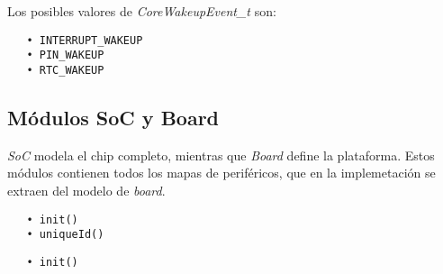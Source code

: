 Los posibles valores de \emph{CoreWakeupEvent\_t} son:

\begin{verbatim}
   • INTERRUPT_WAKEUP
   • PIN_WAKEUP
   • RTC_WAKEUP
\end{verbatim} 








\subsection{Módulos SoC y Board}

\emph{SoC} modela el chip completo, mientras que \emph{Board} define la plataforma. Estos módulos contienen todos los mapas de periféricos, que en la implemetación se extraen del modelo de \emph{board}.


\begin{verbatim}
   • init()
   • uniqueId()
\end{verbatim} 


\begin{verbatim}
   • init()
\end{verbatim} 



